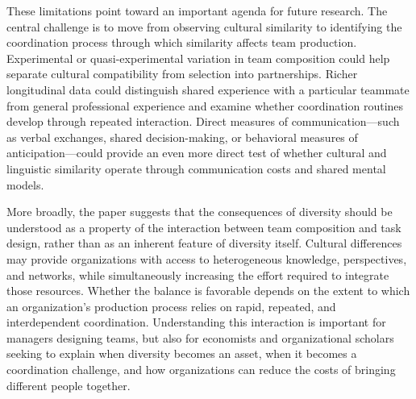 \documentclass[10pt]{article}
\begin{document}

These limitations point toward an important agenda for future research. The central challenge is to move from observing cultural similarity to identifying the coordination process through which similarity affects team production. Experimental or quasi-experimental variation in team composition could help separate cultural compatibility from selection into partnerships. Richer longitudinal data could distinguish shared experience with a particular teammate from general professional experience and examine whether coordination routines develop through repeated interaction. Direct measures of communication—such as verbal exchanges, shared decision-making, or behavioral measures of anticipation—could provide an even more direct test of whether cultural and linguistic similarity operate through communication costs and shared mental models.

More broadly, the paper suggests that the consequences of diversity should be understood as a property of the interaction between team composition and task design, rather than as an inherent feature of diversity itself. Cultural differences may provide organizations with access to heterogeneous knowledge, perspectives, and networks, while simultaneously increasing the effort required to integrate those resources. Whether the balance is favorable depends on the extent to which an organization's production process relies on rapid, repeated, and interdependent coordination. Understanding this interaction is important for managers designing teams, but also for economists and organizational scholars seeking to explain when diversity becomes an asset, when it becomes a coordination challenge, and how organizations can reduce the costs of bringing different people together.


\end{document}
